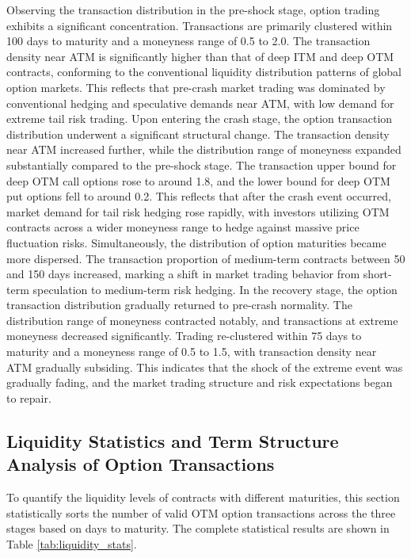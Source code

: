 Observing the transaction distribution in the pre-shock stage, option trading exhibits a significant concentration. Transactions are primarily clustered within 100 days to maturity and a moneyness range of 0.5 to 2.0. The transaction density near ATM is significantly higher than that of deep ITM and deep OTM contracts, conforming to the conventional liquidity distribution patterns of global option markets. This reflects that pre-crash market trading was dominated by conventional hedging and speculative demands near ATM, with low demand for extreme tail risk trading. Upon entering the crash stage, the option transaction distribution underwent a significant structural change. The transaction density near ATM increased further, while the distribution range of moneyness expanded substantially compared to the pre-shock stage. The transaction upper bound for deep OTM call options rose to around 1.8, and the lower bound for deep OTM put options fell to around 0.2. This reflects that after the crash event occurred, market demand for tail risk hedging rose rapidly, with investors utilizing OTM contracts across a wider moneyness range to hedge against massive price fluctuation risks. Simultaneously, the distribution of option maturities became more dispersed. The transaction proportion of medium-term contracts between 50 and 150 days increased, marking a shift in market trading behavior from short-term speculation to medium-term risk hedging. In the recovery stage, the option transaction distribution gradually returned to pre-crash normality. The distribution range of moneyness contracted notably, and transactions at extreme moneyness decreased significantly. Trading re-clustered within 75 days to maturity and a moneyness range of 0.5 to 1.5, with transaction density near ATM gradually subsiding. This indicates that the shock of the extreme event was gradually fading, and the market trading structure and risk expectations began to repair.

\subsection{Liquidity Statistics and Term Structure Analysis of Option Transactions}

To quantify the liquidity levels of contracts with different maturities, this section statistically sorts the number of valid OTM option transactions across the three stages based on days to maturity. The complete statistical results are shown in Table \ref{tab:liquidity_stats}.

